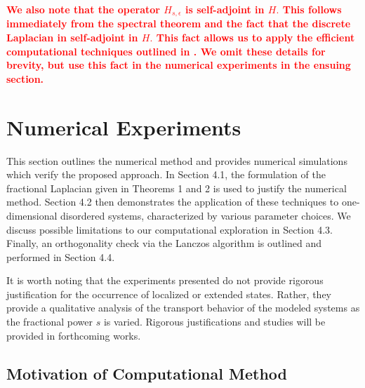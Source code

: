\documentclass[final,1p,times]{elsarticle}
\newcommand{\no}{\noindent}
\theoremstyle{remark}
\theoremstyle{definition}
\newcommand{\josh}[1]{\textcolor{red}{\textbf{#1}}}
\begin{document}

\josh{We also note that the operator $H_{s,\epsilon}$ is self-adjoint in $H.$ This follows immediately from the spectral theorem and the fact that the discrete Laplacian in self-adjoint in $H.$ This fact allows us to apply the efficient computational techniques outlined in \cite{Liaw2013}. We omit these details for brevity, but use this fact in the numerical experiments in the ensuing section.}

\section{Numerical Experiments}

This section outlines the numerical method and provides numerical simulations which verify the proposed approach. 
In Section 4.1, the formulation of the fractional Laplacian given in Theorems 1 and 2 is used to justify the numerical method. Section 4.2 then demonstrates the application of these techniques to one-dimensional disordered systems, characterized by various parameter choices. We discuss possible limitations to our computational exploration in Section 4.3. Finally, an orthogonality check via the Lanczos algorithm is outlined and performed in Section 4.4.

It is worth noting that the experiments presented do not provide rigorous justification for the occurrence of localized or extended states. Rather, they provide a qualitative analysis of the transport behavior of the modeled systems as the fractional power $s$ is varied.
Rigorous justifications and studies will be provided in forthcoming works. 

\subsection{Motivation of Computational Method}
\end{document}
